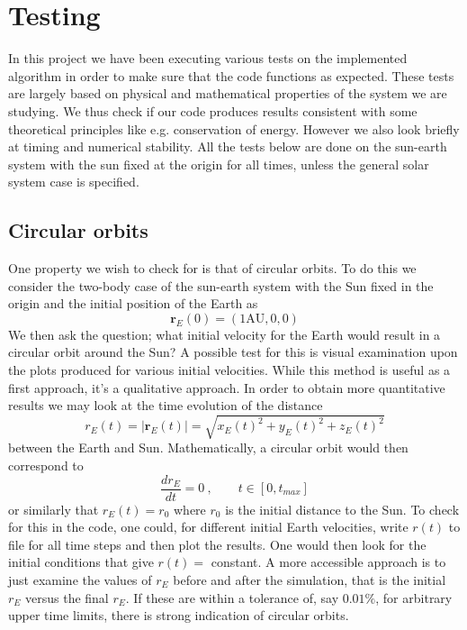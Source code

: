 \documentclass[12pt]{article}
\numberwithin{figure}{section}
\numberwithin{table}{section}
\begin{document}
\section{Testing} \label{sec:testing}
In this project we have been executing various tests on the implemented algorithm in order to make sure that the code functions as expected. These tests are largely based on physical and mathematical properties of the system we are studying. We thus check if our code produces results consistent with some theoretical principles like e.g. conservation of energy. However we also look briefly at timing and numerical stability. All the tests below are done on the sun-earth system with the sun fixed at the origin for all times, unless the general solar system case is specified.

\subsection{Circular orbits} \label{sec:circ_orb}
One property we wish to check for is that of circular orbits. To do this we consider the two-body case of the sun-earth system with  the Sun fixed in the origin and the initial position of the Earth as
\begin{equation}
	\mathbf{r}_E(0)=(1\text{AU},0,0) \label{eq:circ_orb_init_r}
\end{equation}
We then ask the question; what initial velocity for the Earth would result in a circular orbit around the Sun? A possible test for this is visual examination upon the plots produced for various initial velocities. While this method is useful as a first approach, it's a qualitative approach. In order to obtain more quantitative results we may look at the time evolution of the distance
\begin{equation*}
	r_E(t)=|\mathbf{r}_E(t)|=\sqrt{x_E(t)^2+y_E(t)^2+z_E(t)^2}
\end{equation*}
between the Earth and Sun. Mathematically, a circular orbit would then correspond to
\begin{equation*}
	\frac{dr_E}{dt}=0 \ , \qquad t\in[0,t_{max}]
\end{equation*}
or similarly that $r_E(t)=r_0$ where $r_0$ is the initial distance to the Sun. To check for this in the code, one could, for different initial Earth velocities, write $r(t)$ to file for all time steps and then plot the results. One would then look for the initial conditions that give $r(t)=$ constant. A more accessible approach is to just examine the values of $r_E$ before and after the simulation, that is the initial $r_E$ versus the final $r_E$. If these are within a tolerance of, say $0.01\%$, for arbitrary upper time limits, there is strong indication of circular orbits. \\
\end{document}
